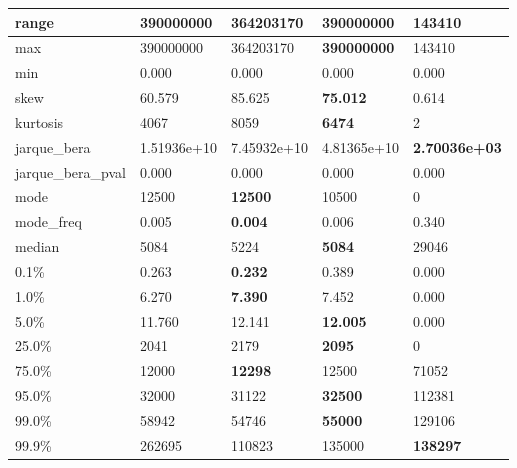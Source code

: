 \begin{table}[H]
\begin{tabular}{|l|m{10em}|m{10em}|m{10em}|m{10em}|}
\hline range & 390000000 & 364203170 & \bfseries 390000000 & \cellcolor[rgb]{0.9, 0.54, 0.52} 143410 \\
\hline max & 390000000 & 364203170 & \bfseries 390000000 & \cellcolor[rgb]{0.9, 0.54, 0.52} 143410 \\
\hline min & 0.000 & 0.000 & 0.000 & 0.000 \\
\hline skew & 60.579 & 85.625 & \bfseries 75.012 & \cellcolor[rgb]{0.9, 0.54, 0.52} 0.614 \\
\hline kurtosis & 4067 & 8059 & \bfseries 6474 & \cellcolor[rgb]{0.9, 0.54, 0.52} 2 \\
\hline jarque\_bera & 1.51936e+10 & \cellcolor[rgb]{0.9, 0.54, 0.52} 7.45932e+10 & 4.81365e+10 & \bfseries 2.70036e+03 \\
\hline jarque\_bera\_pval & 0.000 & 0.000 & 0.000 & 0.000 \\
\hline mode & 12500 & \bfseries 12500 & 10500 & \cellcolor[rgb]{0.9, 0.54, 0.52} 0 \\
\hline mode\_freq & 0.005 & \bfseries 0.004 & 0.006 & \cellcolor[rgb]{0.9, 0.54, 0.52} 0.340 \\
\hline median & 5084 & 5224 & \bfseries 5084 & \cellcolor[rgb]{0.9, 0.54, 0.52} 29046 \\
\hline 0.1\% & 0.263 & \bfseries 0.232 & 0.389 & \cellcolor[rgb]{0.9, 0.54, 0.52} 0.000 \\
\hline 1.0\% & 6.270 & \bfseries 7.390 & 7.452 & \cellcolor[rgb]{0.9, 0.54, 0.52} 0.000 \\
\hline 5.0\% & 11.760 & 12.141 & \bfseries 12.005 & \cellcolor[rgb]{0.9, 0.54, 0.52} 0.000 \\
\hline 25.0\% & 2041 & 2179 & \bfseries 2095 & \cellcolor[rgb]{0.9, 0.54, 0.52} 0 \\
\hline 75.0\% & 12000 & \bfseries 12298 & 12500 & \cellcolor[rgb]{0.9, 0.54, 0.52} 71052 \\
\hline 95.0\% & 32000 & 31122 & \bfseries 32500 & \cellcolor[rgb]{0.9, 0.54, 0.52} 112381 \\
\hline 99.0\% & 58942 & 54746 & \bfseries 55000 & \cellcolor[rgb]{0.9, 0.54, 0.52} 129106 \\
\hline 99.9\% & 262695 & \cellcolor[rgb]{0.9, 0.54, 0.52} 110823 & 135000 & \bfseries 138297 \\
\hline
\end{tabular}
\end{table}
